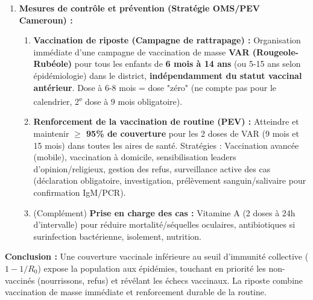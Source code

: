 \documentclass[11pt]{article}
\begin{document}
\begin{exoresolu}
\begin{enumerate}
\begin{itemize}
            \item \textbf{Échec secondaire (perte d'immunité) :} Rareté pour la rougeole (immunité généralement vie), mais possible si immunodépression supervenue.
        \end{itemize}
        \item \textbf{Mesures de contrôle et prévention (Stratégie OMS/PEV Cameroun) :}
        \begin{enumerate}
            \item \textbf{Vaccination de riposte (Campagne de rattrapage) :} Organisation immédiate d'une campagne de vaccination de masse \textbf{VAR (Rougeole-Rubéole)} pour tous les enfants de \textbf{6 mois à 14 ans} (ou 5-15 ans selon épidémiologie) dans le district, \textbf{indépendamment du statut vaccinal antérieur}. Dose à 6-8 mois = dose "zéro" (ne compte pas pour le calendrier, 2\textsuperscript{e} dose à 9 mois obligatoire).
            \item \textbf{Renforcement de la vaccination de routine (PEV) :} Atteindre et maintenir \textbf{$\geq$ 95\% de couverture} pour les 2 doses de VAR (9 mois et 15 mois) dans toutes les aires de santé. Stratégies : Vaccination avancée (mobile), vaccination à domicile, sensibilisation leaders d'opinion/religieux, gestion des refus, surveillance active des cas (déclaration obligatoire, investigation, prélèvement sanguin/salivaire pour confirmation IgM/PCR).
            \item (Complément) \textbf{Prise en charge des cas :} Vitamine A (2 doses à 24h d'intervalle) pour réduire mortalité/séquelles oculaires, antibiotiques si surinfection bactérienne, isolement, nutrition.
        \end{enumerate}
    \end{enumerate}
    \textbf{Conclusion :} Une couverture vaccinale inférieure au seuil d'immunité collective ($1-1/R_0$) expose la population aux épidémies, touchant en priorité les non-vaccinés (nourrissons, refus) et révélant les échecs vaccinaux. La riposte combine vaccination de masse immédiate et renforcement durable de la routine.
\end{exoresolu}
\end{document}
